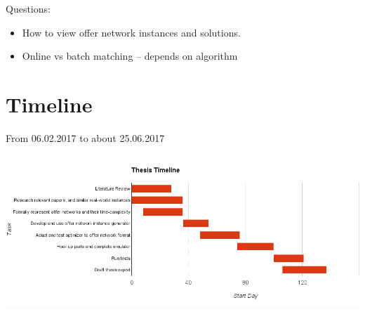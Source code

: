 \documentclass[11pt]{article}
\begin{document}
Questions: 
\begin{itemize}
\item How to view offer network instances and solutions. \\
\item Online vs batch matching -- depends on algorithm \\
\end{itemize}

\section{Timeline}
From 06.02.2017 to about 25.06.2017

\includegraphics[width=\textwidth]{gantt.png}
\end{document}
